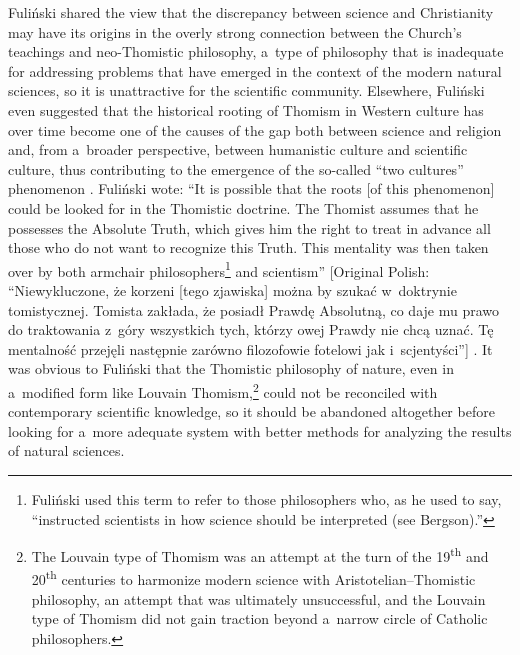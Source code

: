 Fuliński shared the view that the discrepancy between science and Christianity may have its origins in the overly strong connection between the Church's teachings and neo-Thomistic philosophy, a~type of philosophy that is inadequate for addressing problems that have emerged in the context of the modern natural sciences, so it is unattractive for the scientific community. Elsewhere, Fuliński even suggested that the historical rooting of Thomism in Western culture has over time become one of the causes of the gap both between science and religion and, from a~broader perspective, between humanistic culture and scientific culture, thus contributing to the emergence of the so-called ``two cultures'' phenomenon 
\parencite[][]{snow_two_1959}. %
 Fuliński wote: ``It is possible that the roots [of this phenomenon] could be looked for in the Thomistic doctrine. The Thomist assumes that he possesses the Absolute Truth, which gives him the right to treat in advance all those who do not want to recognize this Truth. This mentality was then taken over by both armchair philosophers\footnote{Fuliński used this term to refer to those philosophers who, as he used to say, ``instructed scientists in how science should be interpreted (see Bergson).''} and scientism'' [Original Polish: ``Niewykluczone, że korzeni [tego zjawiska] można by szukać w~doktrynie tomistycznej. Tomista zakłada, że posiadł Prawdę Absolutną, co daje mu prawo do traktowania z~góry wszystkich tych, którzy owej Prawdy nie chcą uznać. Tę mentalność przejęli następnie zarówno filozofowie fotelowi jak i~scjentyści''] 
\parencite[][p.32]{fulinski_o_1993}. %
 It was obvious to Fuliński that the Thomistic philosophy of nature, even in a~modified form like Louvain Thomism,\footnote{The Louvain type of Thomism was an attempt at the turn of the 19\textsuperscript{th} and 20\textsuperscript{th} centuries to harmonize modern science with Aristotelian–Thomistic philosophy, an attempt that was ultimately unsuccessful, and the Louvain type of Thomism did not gain traction beyond a~narrow circle of Catholic philosophers. } could not be reconciled with contemporary scientific knowledge, so it should be abandoned altogether before looking for a~more adequate system with better methods for analyzing the results of natural sciences.



